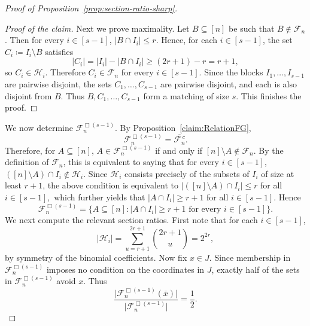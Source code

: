 \documentclass[11pt]{article}
\theoremstyle{definition}
\newenvironment{poc}{\begin{proof}[Proof of the claim]\renewcommand*{\qedsymbol}{$\blacksquare$}}{\end{proof}}
\begin{document}
\begin{proof}[Proof of Proposition~\ref{prop:section-ratio-sharp}]
\begin{poc}
Next we prove maximality. Let \(B\subseteq [n]\) be such that \(B\notin \mathcal{F}_{n}\). Then for every \(i\in [s-1]\),
\(
|B\cap I_{i}|\le r.
\)
Hence, for each \(i\in [s-1]\), the set
\(
C_{i}\coloneqq I_{i}\setminus B
\)
satisfies
\[
|C_{i}|=|I_i|-|B\cap I_i|\ge (2r+1)-r=r+1,
\]
so \(C_i\in \mathcal{H}_i\). Therefore \(C_i\in \mathcal{F}_n\) for every \(i\in [s-1]\). Since the blocks \(I_1,\dots,I_{s-1}\) are pairwise disjoint, the sets \(C_1,\dots,C_{s-1}\) are pairwise disjoint, and each is also disjoint from \(B\). Thus
\(
B,C_1,\dots,C_{s-1}
\)
form a matching of size \(s\). This finishes the proof.
\end{poc}
We now determine \(\mathcal{F}_{n}^{\Box(s-1)}\). By Proposition~\ref{claim:RelationFG},
\[
\mathcal{F}_{n}^{\Box(s-1)}=\overline{\mathcal{F}_{n}^{\,c}}.
\]
Therefore, for \(A\subseteq [n]\),
\(
A\in \mathcal{F}_{n}^{\Box(s-1)}
\) if and only if
\(
[n]\setminus A\notin \mathcal{F}_{n}.
\)
By the definition of \(\mathcal{F}_n\), this is equivalent to saying that for every \(i\in [s-1]\),
\(
([n]\setminus A)\cap I_i \notin \mathcal H_i.
\)
Since \(\mathcal H_i\) consists precisely of the subsets of \(I_i\) of size at least \(r+1\), the above condition is equivalent to
\(
|([n]\setminus A)\cap I_i|\le r
\)
for all \(i\in [s-1],\) which further yields that
\(
|A\cap I_i|\ge r+1
\)
for all \(i\in [s-1].\)
Hence
\[
\mathcal{F}_{n}^{\Box(s-1)}
=
\bigl\{
A\subseteq [n]:
|A\cap I_i|\ge r+1 \text{ for every }i\in [s-1]
\bigr\}.
\]
We next compute the relevant section ratios. First note that for each \(i\in [s-1]\),
\[
|\mathcal H_i|
=
\sum_{u=r+1}^{2r+1}\binom{2r+1}{u}
=
2^{2r},
\]
by symmetry of the binomial coefficients. Now fix \(x\in J\). Since membership in \(\mathcal{F}_{n}^{\Box(s-1)}\) imposes no condition on the coordinates in \(J\), exactly half of the sets in \(\mathcal{F}_{n}^{\Box(s-1)}\) avoid \(x\). Thus
\[
\frac{\bigl|\mathcal{F}_{n}^{\Box(s-1)}(\overline{x})\bigr|}
     {\bigl|\mathcal{F}_{n}^{\Box(s-1)}\bigr|}
=
\frac12.
\]


\end{proof}
\end{document}
